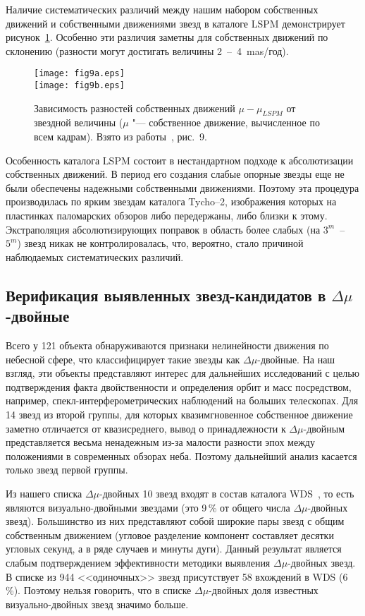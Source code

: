 Наличие систематических различий между нашим набором собственных движений и собственными движениями звезд в каталоге LSPM демонстрирует рисунок~\ref{fig:15dmu}. Особенно эти различия заметны для собственных движений по склонению (разности могут достигать величины 2~--~4~mas/год).
\begin{figure}[h]
\centering
\texttt{[image: fig9a.eps]}\\
\texttt{[image: fig9b.eps]}
\caption{Зависимость разностей собственных движений $\mu - \mu_{LSPM}$ от звездной величины ($\mu$ "--- собственное движение, вычисленное по всем кадрам). Взято из работы~\cite{2015AstL...41..833K}, рис.~9.}
\label{fig:15dmu}
\end{figure}
Особенность каталога LSPM состоит в нестандартном подходе к абсолютизации собственных движений. В период его создания слабые опорные звезды еще не были обеспечены надежными собственными движениями. Поэтому эта процедура производилась по ярким звездам каталога Tycho--2, изображения которых на пластинках паломарских обзоров либо передержаны, либо близки к этому. Экстраполяция абсолютизирующих поправок в область более слабых (на $3^m$~--~$5^m$) звезд никак не контролировалась, что, вероятно, стало причиной наблюдаемых систематических различий.
\subsection{Верификация выявленных звезд-кандидатов в $\Delta\mu$-двойные} \label{subsec:ch3/sect3/sub3}
Всего у 121 объекта обнаруживаются признаки нелинейности движения по небесной сфере, что классифицирует такие звезды как $\Delta\mu$-двойные. На наш взгляд, эти объекты представляют интерес для дальнейших исследований с целью подтверждения факта двойственности и определения орбит и масс посредством, например,  спекл-интерферометрических наблюдений на больших телескопах. Для 14 звезд из второй группы, для которых квазимгновенное собственное движение заметно отличается от квазисреднего, вывод о принадлежности к $\Delta\mu$-двойным представляется весьма ненадежным из-за малости разности эпох между положениями в современных обзорах неба. Поэтому дальнейший анализ касается только звезд первой группы.

Из нашего списка $\Delta\mu$-двойных 10 звезд входят в состав каталога WDS~\cite{2001AJ....122.3466M}, то есть являются визуально-двойными звездами (это 9\,\% от общего числа $\Delta\mu$-двойных звезд). Большинство из них представляют собой широкие пары звезд с общим собственным движением (угловое разделение компонент составляет десятки угловых секунд, а в ряде случаев и минуты дуги). Данный результат является слабым подтверждением эффективности методики выявления $\Delta\mu$-двойных звезд. В списке из 944 <<одиночных>> звезд присутствует 58 вхождений в WDS (6\,\%). Поэтому нельзя говорить, что в списке  $\Delta\mu$-двойных доля известных визуально-двойных звезд значимо больше.

